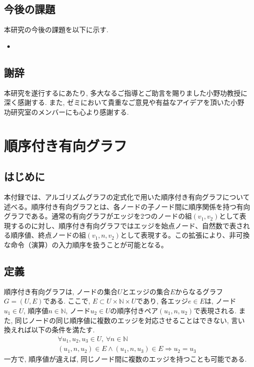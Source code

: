 \documentclass[11pt,oneside,openany,report]{jsbook}
\begin{document}
\section{今後の課題}

本研究の今後の課題を以下に示す.

\begin{itemize}
  \item
\end{itemize}

\section{謝辞}

本研究を遂行するにあたり, 多大なるご指導とご助言を賜りました小野功教授に深く感謝する. また, ゼミにおいて貴重なご意見や有益なアイデアを頂いた小野功研究室のメンバーにも心より感謝する.




\appendix

\chapter{順序付き有向グラフ} \label{chap:ordered_directed_graph}

\section{はじめに}
本付録では、アルゴリズムグラフの定式化で用いた順序付き有向グラフについて述べる。順序付き有向グラフとは、各ノードの子ノード間に順序関係を持つ有向グラフである。通常の有向グラフがエッジを2つのノードの組$(v_1, v_2)$として表現するのに対し、順序付き有向グラフではエッジを始点ノード、自然数で表される順序値、終点ノードの組$(v_1, n, v_2)$として表現する。この拡張により、非可換な命令（演算）の入力順序を扱うことが可能となる。

\section{定義}
順序付き有向グラフは, ノードの集合$U$とエッジの集合$E$からなるグラフ$G = (U, E)$である. ここで, $E \subset U \times \mathbb{N} \times U$であり, 各エッジ$e \in E$は, ノード$u_1 \in U$, 順序値$n \in \mathbb{N}$, ノード$u_2 \in U$の順序付きペア$(u_1, n, u_2)$で表現される. また, 同じノードの同じ順序値に複数のエッジを対応させることはできない, 言い換えれば以下の条件を満たす.
\begin{gather*}
\forall u_1, u_2, u_3 \in U,\ \forall n \in \mathbb{N} \\
(u_1, n, u_2) \in E \land (u_1, n, u_3) \in E \Rightarrow u_2 = u_3
\end{gather*}
\noindent
一方で, 順序値が違えば, 同じノード間に複数のエッジを持つことも可能である.
\end{document}
